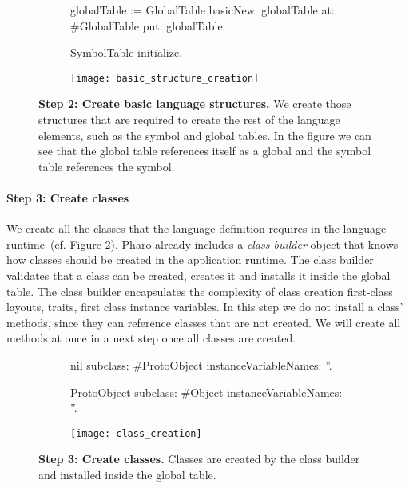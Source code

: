 \begin{figure}[ht]
\begin{subfigure}{.45\linewidth}
\begin{code}
globalTable := GlobalTable basicNew.
globalTable
    at: #GlobalTable
    put: globalTable.
    
SymbolTable initialize.
\end{code}
\end{subfigure}
\begin{subfigure}{.55\linewidth}
\texttt{[image: basic\_structure\_creation]}
\end{subfigure}
\caption{\textbf{Step 2: Create basic language structures.} We create those structures that are required to create the rest of the language elements, such as the symbol and global tables. In the figure we can see that the global table references itself as a global and the symbol table references the  symbol.\label{fig:basic_structure_creation}}
\end{figure}

\paragraph{\textbf{Step 3: Create classes}}
We create all the classes that the language definition requires in the language runtime~(cf. Figure \ref{fig:class_creation}). Pharo already includes a \emph{class builder} object that knows how classes should be created in the application runtime. The class builder validates that a class can be created, creates it and installs it inside the global table. The class builder encapsulates the complexity of class creation \eg first-class layouts, traits, first class instance variables. In this step we do not install a class' methods, since they can reference classes that are not created. We will create all methods at once in a next step once all classes are created.

\begin{figure}[ht]
\begin{subfigure}{.4\linewidth}
\begin{code}
nil subclass: #ProtoObject
    instanceVariableNames: ''.

ProtoObject
    subclass: #Object
    instanceVariableNames: ''.
\end{code}
\end{subfigure}
\begin{subfigure}{.6\linewidth}
\texttt{[image: class\_creation]}
\end{subfigure}
\caption{\textbf{Step 3: Create classes.} Classes are created by the class builder and installed inside the global table. \label{fig:class_creation}}
\end{figure}

